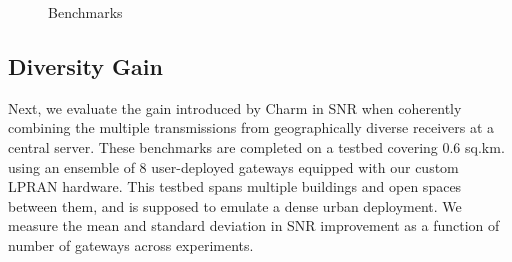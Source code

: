 \begin{figure}[!t]
\centering
{}
\hfill
{}
\hfill
{}
\compactimg
\caption{Benchmarks}
\label{fig:results}
\compactimg
\end{figure}

\subsection{Diversity Gain}
\label{sec:diversity-gain-eval}

Next, we evaluate the  gain introduced by Charm in SNR when coherently
combining the multiple transmissions from geographically diverse receivers at
a central server. These benchmarks are completed on a testbed covering 0.6
sq.km. using an ensemble of 8 user-deployed gateways equipped with our custom
LPRAN hardware. This testbed spans multiple buildings and open spaces between
them, and is supposed to emulate a dense urban deployment. We measure the mean
and standard deviation in SNR improvement as a function of number of gateways
across experiments.

